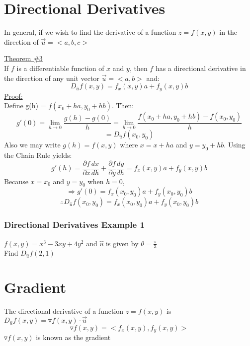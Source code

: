 \documentclass[12pt]{article}
\begin{document}
\section{Directional Derivatives}
In general, if we wish to find the derivative of a function \(z=f(x,y)\) in the direction of \(\vec{u} = <a,b,c>\)

\underline{Theorem \#3}\\
If \(f\) is a differentiable function of \(x\) and \(y\), then \(f\) has a directional derivative in the direction of any unit vector \(\vec{u}  = <a,b>\) and:
\[
	D_{\hat{u}}f(x,y) = f_x(x,y)a + f_y(x,y)b
\]
\underline{Proof:} \\
Define g(h) = \(f(x_0+ha,y_0+hb)\). Then:
\[
	g'(0) = \lim_{h \to 0} \frac{g(h) - g(0)}{h} = \lim_{h \to 0} \frac{f(x_0 + ha,y_0+hb) - f(x_0,y_0)}{h}
\]
\[
=	D_{\hat{u}}f(x_0,y_0) 
\]
Also we may write \(g(h) = f(x,y)\) where \(x=x+ha\) and \(y=y_0 +hb\). 
Using the Chain Rule yields:
\[
	g'(h) = \frac{\partial f}{\partial x} \frac{dx}{dh}+ \frac{\partial f}{\partial y} \frac{dy}{dh} = f_x(x,y)a + f_y(x,y)b
\]
Because \(x=x_0\) and \(y=y_0\) when \(h=0\),
\[
	\Rightarrow g'(0) = f_x(x_0,y_0)a + f_y(x_0,y_0)b
\]
\[
	\therefore D_{\hat{u} }f(x_0,y_0) = f_x(x_0,y_0)a + f_y(x_0,y_0)b
\]

\subsubsection{Directional Derivatives Example 1}
\(f(x,y) = x^3 - 3xy + 4y^2\) and \(\hat{u}\) is given by \(\theta = \frac{\pi}{3}\)\\
Find \(D_{\hat{u}}f(2,1)\)

\section{Gradient}
The directional derivative of a function \(z=f(x,y)\) is \(D_{\hat{u}}f(x,y) = \triangledown f(x,y) \cdot \vec{u} \)
\[
	\triangledown f(x,y) = <f_x(x,y),f_y(x,y)>
\]
\(\triangledown f(x,y)\) is known as the gradient 
\end{document}
